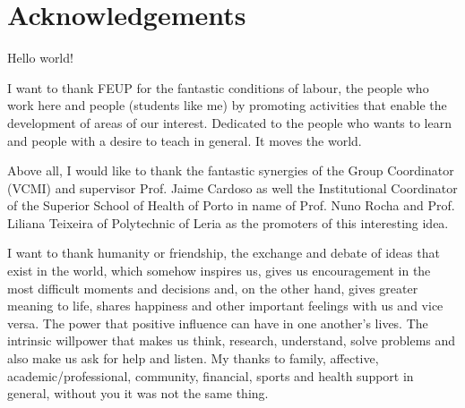 \chapter*{Acknowledgements}

Hello world!

I want to thank FEUP for the fantastic conditions of labour, the people who work here and people (students like me) by promoting activities that enable the development of areas of our interest.
Dedicated to the people who wants to learn and people with a desire to teach in general. It moves the world.

Above all, I would like to thank the fantastic synergies of the Group Coordinator (VCMI) and supervisor Prof. Jaime Cardoso  as well the Institutional Coordinator of the Superior School of Health of Porto in name of Prof. Nuno Rocha and Prof. Liliana Teixeira of Polytechnic of Leria as the promoters of this interesting idea. 

I want to thank humanity or friendship, the exchange and debate of ideas that exist in the world, which somehow inspires us, gives us encouragement in the most difficult moments and decisions and, on the other hand, gives greater meaning to life, shares happiness and other important feelings with us and vice versa. The power that positive influence can have in one another's lives.
The intrinsic willpower that makes us think, research, understand, solve problems and also make us ask for help and listen.
My thanks to family, affective, academic/professional, community, financial, sports and health support in general, without you it was not the same thing.

\vspace{10mm}
